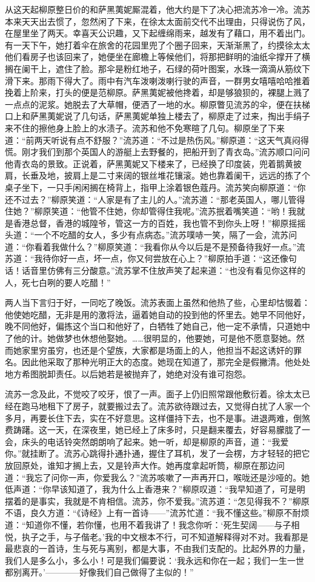 \par 从这天起柳原整日价的和萨黑荑妮厮混着，他大约是下了决心把流苏冷一冷。流苏本来天天出去惯了，忽然闲了下来，在徐太太面前交代不出理由，只得说伤了风，在屋里坐了两天。幸喜天公识趣，又下起缠绵雨来，越发有了藉口，用不着出门。有一天下午，她打着伞在旅舍的花园里兜了个圈子回来，天渐渐黑了，约摸徐太太他们看房子也该回来了，她便坐在廊檐上等候他们，将那把鲜明的油纸伞撑开了横搁在阑干上，遮住了脸。那伞是粉红地子，石绿的荷叶图案，水珠一滴滴从筋纹下滑下来。那雨下得大了。雨中有汽车泼喇泼喇行驶的声音，一群男女嘻嘻哈哈推着挽着上阶来，打头的便是范柳原。萨黑荑妮被他搀着，却是够狼狈的，裸腿上溅了一点点的泥浆。她脱去了大草帽，便洒了一地的水。柳原瞥见流苏的伞，便在扶梯口上和萨黑荑妮说了几句话，萨黑荑妮单独上楼去了，柳原走了过来，掏出手绢子来不住的擦他身上脸上的水渍子。流苏和他不免寒暄了几句。柳原坐了下来道：“前两天听说有点不舒服？”流苏道：“不过是热伤风。”柳原道：“这天气真闷得慌。刚才我们到那个英国人的游艇上去野餐的，把船开到了青衣岛。”流苏顺口问问他青衣岛的景致。正说着，萨黑荑妮又下楼来了，已经换了印度装，兜着鹅黄披肩，长垂及地，披肩上是二寸来阔的银丝堆花镶滚。她也靠着阑干，远远的拣了个桌子坐下，一只手闲闲搁在椅背上，指甲上涂着银色蔻丹。流苏笑向柳原道：“你还不过去？”柳原笑道：“人家是有了主儿的人。”流苏道：“那老英国人，哪儿管得住她？”柳原笑道：“他管不住她，你却管得住我呢。”流苏抿着嘴笑道：“哟！我就是香港总督，香港的城隍爷，管这一方的百姓，我也管不到你头上呀！”柳原摇摇头道：“一个不吃醋的女人，多少有点病态。”流苏噗哧一笑，隔了一会，流苏问道：“你看着我做什么？”柳原笑道：“我看你从今以后是不是预备待我好一点。”流苏道：“我待你好一点，坏一点，你又何尝放在心上？”柳原拍手道：“这还像句话！话音里仿佛有三分酸意。”流苏掌不住放声笑了起来道：“也没有看见你这样的人，死七白咧的要人吃醋！”
\par 两人当下言归于好，一同吃了晚饭。流苏表面上虽然和他热了些，心里却怙惙着：他使她吃醋，无非是用的激将法，逼着她自动的投到他的怀里去。她早不同他好，晚不同他好，偏拣这个当口和他好了，白牺牲了她自己，他一定不承情，只道她中了他的计。她做梦也休想他娶她。……很明显的，他要她，可是他不愿意娶她。然而她家里穷虽穷，也还是个望族，大家都是场面上的人，他担当不起这诱奸的罪名。因此他采取了那种光明正大的态度。她现在知道了，那完全是假撇清。他处处地方希图脱卸责任。以后她若是被抛弃了，她绝对没有谁可抱怨。
\par 流苏一念及此，不觉咬了咬牙，恨了一声。面子上仍旧照常跟他敷衍着。徐太太已经在跑马地租下了房子，就要搬过去了。流苏欲待跟过去，又觉得白扰了人家一个多月，再要长住下去，实在不好意思。这样僵持下去，也不是事。进退两难，倒煞费踌躇。这一天，在深夜里，她已经上了床多时，只是翻来覆去，好容易朦胧了一会，床头的电话铃突然朗朗响了起来。她一听，却是柳原的声音，道：“我爱你。”就挂断了。流苏心跳得扑通扑通，握住了耳机，发了一会楞，方才轻轻的把它放回原处，谁知才搁上去，又是铃声大作。她再度拿起听筒，柳原在那边问道：“我忘了问你一声，你爱我么？”流苏咳嗽了一声再开口，喉咙还是沙哑的。她低声道：“你早该知道了，我为什么上香港来？”柳原叹道：“我早知道了，可是明摆着的是事实，我就是不肯相信。流苏，你不爱我。”流苏道：“怎见得我不？”柳原不语，良久方道：“《诗经》上有一首诗——”流苏忙道：“我不懂这些。”柳原不耐烦道：“知道你不懂，若你懂，也用不着我讲了！我念你听：‘死生契阔——与子相悦，执子之手，与子偕老。’我的中文根本不行，可不知道解释得对不对。我看那是最悲哀的一首诗，生与死与离别，都是大事，不由我们支配的。比起外界的力量，我们人是多么小，多么小！可是我们偏要说：‘我永远和你在一起；我们一生一世都别离开。'————好像我们自己做得了主似的！”
